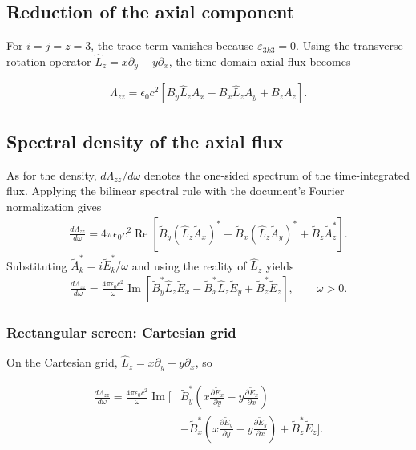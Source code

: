 \subsection{Reduction of the axial component}

For $i=j=z=3$, the trace term vanishes because
$\varepsilon_{3k3}=0$.  Using the transverse rotation operator
$\hat L_z=x\partial_y-y\partial_x$, the time-domain axial flux becomes
\begin{highlightbox}
  \begin{align}
    \Lambda_{zz}=\epsilon_0c^2\left[
      B_y\hat L_z A_x-B_x\hat L_z A_y+B_z A_z
    \right].
    \label{eq:canonical-oam-axial-flux}
  \end{align}
\end{highlightbox}

\subsection{Spectral density of the axial flux}

As for the density, $d\Lambda_{zz}/d\omega$ denotes the one-sided
spectrum of the time-integrated flux.  Applying the bilinear spectral
rule with the document's Fourier normalization gives
\begin{align}
  \frac{d\Lambda_{zz}}{d\omega}
  =4\pi\epsilon_0c^2\operatorname{Re}\left[
    \tilde B_y(\hat L_z\tilde A_x)^*
    -\tilde B_x(\hat L_z\tilde A_y)^*
    +\tilde B_z\tilde A_z^*
  \right].
  \label{eq:canonical-oam-flux-bilinear}
\end{align}
Substituting $\tilde A_k^*=i\tilde E_k^*/\omega$ and using the reality of
$\hat L_z$ yields
\begin{align}
  \frac{d\Lambda_{zz}}{d\omega}
  =\frac{4\pi\epsilon_0c^2}{\omega}\operatorname{Im}\left[
    \tilde B_y^*\hat L_z\tilde E_x
    -\tilde B_x^*\hat L_z\tilde E_y
    +\tilde B_z^*\tilde E_z
  \right],\qquad \omega>0.
  \label{eq:canonical-oam-flux-spectrum}
\end{align}

\subsubsection{Rectangular screen: Cartesian grid}

On the Cartesian grid, $\hat L_z=x\partial_y-y\partial_x$, so
\begin{importantbox}
  \begin{align}
    \frac{d\Lambda_{zz}}{d\omega}
    =\frac{4\pi\epsilon_0c^2}{\omega}\operatorname{Im}\Bigg[&
      \tilde B_y^*\left(
        x\frac{\partial\tilde E_x}{\partial y}
      -y\frac{\partial\tilde E_x}{\partial x}\right)
      \nonumber\\
      &-\tilde B_x^*\left(
        x\frac{\partial\tilde E_y}{\partial y}
      -y\frac{\partial\tilde E_y}{\partial x}\right)
    +\tilde B_z^*\tilde E_z\Bigg].
    \label{eq:canonical-oam-flux-cartesian}
  \end{align}
\end{importantbox}

